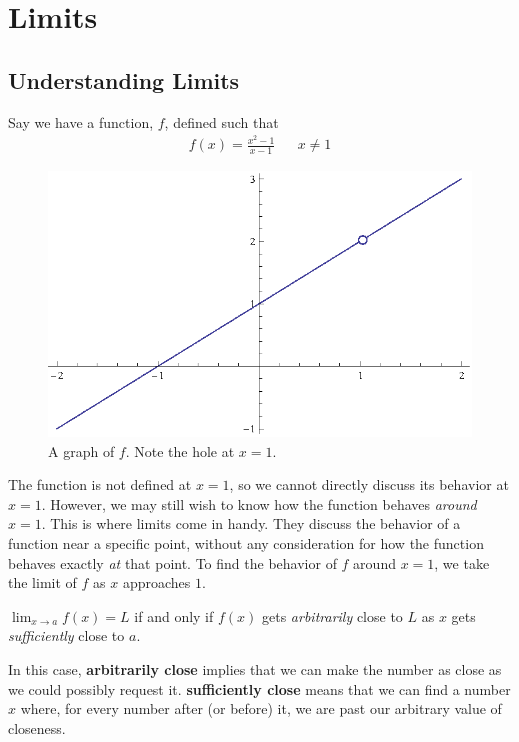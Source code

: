 \chapter{Limits}\label{limits} 


\section{Understanding Limits}

Say we have a function, \(f\), defined such that
\begin{align}
  f(x)=\frac{x^2-1}{x-1}
  && x \neq 1
\end{align}
\begin{figure}[h]
  \begin{center}
    \includegraphics[scale=0.7]{graphs/p1ch3x2m1xm1.eps}
  \end{center}
  \caption{A graph of \(f\). Note the hole at \(x=1\).}
\end{figure}
The function is not defined at \(x=1\), so we cannot directly discuss its behavior at \(x=1\).
However, we may still wish to know how the function behaves \emph{around} \(x=1\).
This is where limits come in handy.
They discuss the behavior of a function near a specific point, without any consideration for how the function behaves exactly \emph{at} that point.
To find the behavior of \(f\) around \(x=1\), we take the limit of \(f\) as \(x\) approaches \(1\).
\begin{defn}\label{defn:limi}
  \( \lim_{x \to a} f(x) = L \) if and only if \(f(x)\) gets \emph{arbitrarily} close to \( L \) as \(x\) gets \emph{sufficiently} close to \(a\).
\end{defn}
\begin{remark}
  In this case, \textbf{arbitrarily close} implies that we can make the number as close as we could possibly request it. \textbf{sufficiently close} means that we can find a number $x$ where, for every number after (or before) it, we are past our arbitrary value of closeness.
\end{remark}
